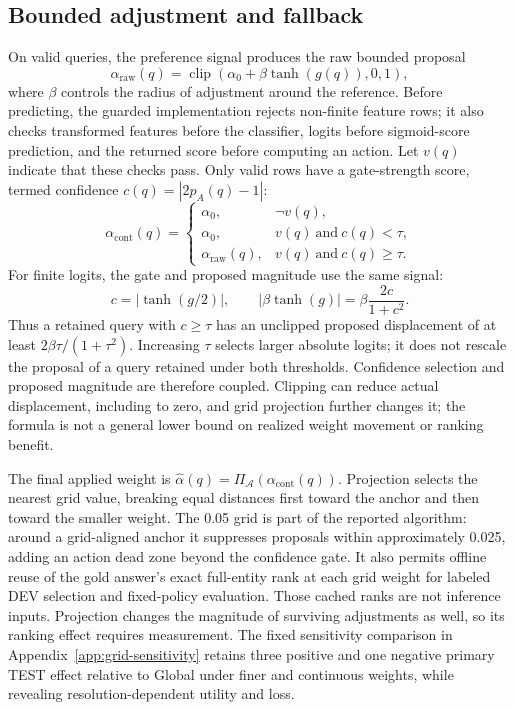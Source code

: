 \documentclass[11pt,a4paper]{article}
\newcommand{\clip}{\operatorname{clip}}
\newcommand{\Agrid}{\mathcal{A}}
\begin{document}
\subsection{Bounded adjustment and fallback}
On valid queries, the preference signal produces the raw bounded proposal
\begin{equation}
\alpha_{\mathrm{raw}}(q)=\clip\!\left(\alpha_0+\beta\tanh(g(q)),0,1\right),
\label{eq:raw}
\end{equation}
where $\beta$ controls the radius of adjustment around the reference. Before predicting, the guarded implementation rejects non-finite feature rows; it also checks transformed features before the classifier, logits before sigmoid-score prediction, and the returned score before computing an action. Let $v(q)$ indicate that these checks pass. Only valid rows have a gate-strength score, termed confidence $c(q)=|2p_A(q)-1|$:
\begin{equation}
\alpha_{\mathrm{cont}}(q)=
\begin{cases}
\alpha_0, & \neg v(q),\\
\alpha_0, & v(q)\ \text{and}\ c(q)<\tau,\\
\alpha_{\mathrm{raw}}(q), & v(q)\ \text{and}\ c(q)\geq\tau.
\end{cases}
\label{eq:fallback}
\end{equation}
For finite logits, the gate and proposed magnitude use the same signal:
\begin{equation}
c=|\tanh(g/2)|,\qquad |\beta\tanh(g)|=\beta\frac{2c}{1+c^2}.
\label{eq:confidence-displacement}
\end{equation}
Thus a retained query with $c\geq\tau$ has an unclipped proposed displacement of at least $2\beta\tau/(1+\tau^2)$. Increasing $\tau$ selects larger absolute logits; it does not rescale the proposal of a query retained under both thresholds. Confidence selection and proposed magnitude are therefore coupled. Clipping can reduce actual displacement, including to zero, and grid projection further changes it; the formula is not a general lower bound on realized weight movement or ranking benefit.

The final applied weight is $\widehat\alpha(q)=\Pi_{\Agrid}(\alpha_{\mathrm{cont}}(q))$. Projection selects the nearest grid value, breaking equal distances first toward the anchor and then toward the smaller weight. The 0.05 grid is part of the reported algorithm: around a grid-aligned anchor it suppresses proposals within approximately 0.025, adding an action dead zone beyond the confidence gate. It also permits offline reuse of the gold answer's exact full-entity rank at each grid weight for labeled DEV selection and fixed-policy evaluation. Those cached ranks are not inference inputs. Projection changes the magnitude of surviving adjustments as well, so its ranking effect requires measurement. The fixed sensitivity comparison in Appendix~\ref{app:grid-sensitivity} retains three positive and one negative primary TEST effect relative to Global under finer and continuous weights, while revealing resolution-dependent utility and loss.
\end{document}
